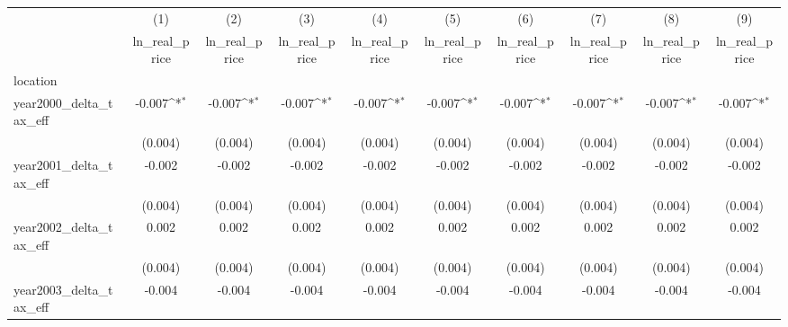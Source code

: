{
\def\sym#1{\ifmmode^{#1}\else\(^{#1}\)\fi}
\begin{tabular}{l*{9}{c}}
\hline\hline
            &\multicolumn{1}{c}{(1)}&\multicolumn{1}{c}{(2)}&\multicolumn{1}{c}{(3)}&\multicolumn{1}{c}{(4)}&\multicolumn{1}{c}{(5)}&\multicolumn{1}{c}{(6)}&\multicolumn{1}{c}{(7)}&\multicolumn{1}{c}{(8)}&\multicolumn{1}{c}{(9)}\\
            &\multicolumn{1}{c}{ln_real_price}&\multicolumn{1}{c}{ln_real_price}&\multicolumn{1}{c}{ln_real_price}&\multicolumn{1}{c}{ln_real_price}&\multicolumn{1}{c}{ln_real_price}&\multicolumn{1}{c}{ln_real_price}&\multicolumn{1}{c}{ln_real_price}&\multicolumn{1}{c}{ln_real_price}&\multicolumn{1}{c}{ln_real_price}\\
\hline
location    &                     &                     &                     &                     &                     &                     &                     &                     &                     \\
year2000_delta_tax_eff&      -0.007\sym{*}  &      -0.007\sym{*}  &      -0.007\sym{*}  &      -0.007\sym{*}  &      -0.007\sym{*}  &      -0.007\sym{*}  &      -0.007\sym{*}  &      -0.007\sym{*}  &      -0.007\sym{*}  \\
            &     (0.004)         &     (0.004)         &     (0.004)         &     (0.004)         &     (0.004)         &     (0.004)         &     (0.004)         &     (0.004)         &     (0.004)         \\
[1em]
year2001_delta_tax_eff&      -0.002         &      -0.002         &      -0.002         &      -0.002         &      -0.002         &      -0.002         &      -0.002         &      -0.002         &      -0.002         \\
            &     (0.004)         &     (0.004)         &     (0.004)         &     (0.004)         &     (0.004)         &     (0.004)         &     (0.004)         &     (0.004)         &     (0.004)         \\
[1em]
year2002_delta_tax_eff&       0.002         &       0.002         &       0.002         &       0.002         &       0.002         &       0.002         &       0.002         &       0.002         &       0.002         \\
            &     (0.004)         &     (0.004)         &     (0.004)         &     (0.004)         &     (0.004)         &     (0.004)         &     (0.004)         &     (0.004)         &     (0.004)         \\
[1em]
year2003_delta_tax_eff&      -0.004         &      -0.004         &      -0.004         &      -0.004         &      -0.004         &      -0.004         &      -0.004         &      -0.004         &      -0.004         \\

\end{tabular}}
